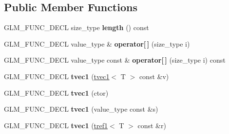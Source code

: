 \subsection*{\-Public \-Member \-Functions}
\begin{DoxyCompactItemize}
\item 
\hypertarget{structglm_1_1detail_1_1tvec1_a92aef643d6d587eb3c0cdc08710d4f74}{\-G\-L\-M\-\_\-\-F\-U\-N\-C\-\_\-\-D\-E\-C\-L size\-\_\-type {\bfseries length} () const }\label{structglm_1_1detail_1_1tvec1_a92aef643d6d587eb3c0cdc08710d4f74}

\item 
\hypertarget{structglm_1_1detail_1_1tvec1_a20e586dbb0fdfd345c66250a776b1246}{\-G\-L\-M\-\_\-\-F\-U\-N\-C\-\_\-\-D\-E\-C\-L value\-\_\-type \& {\bfseries operator\mbox{[}$\,$\mbox{]}} (size\-\_\-type i)}\label{structglm_1_1detail_1_1tvec1_a20e586dbb0fdfd345c66250a776b1246}

\item 
\hypertarget{structglm_1_1detail_1_1tvec1_ad8458f51c2f212caf4f1a66ca507514b}{\-G\-L\-M\-\_\-\-F\-U\-N\-C\-\_\-\-D\-E\-C\-L value\-\_\-type const \& {\bfseries operator\mbox{[}$\,$\mbox{]}} (size\-\_\-type i) const }\label{structglm_1_1detail_1_1tvec1_ad8458f51c2f212caf4f1a66ca507514b}

\item 
\hypertarget{structglm_1_1detail_1_1tvec1_a223f0b0626a866f6d6eff1110623a20d}{\-G\-L\-M\-\_\-\-F\-U\-N\-C\-\_\-\-D\-E\-C\-L {\bfseries tvec1} (\hyperlink{structglm_1_1detail_1_1tvec1}{tvec1}$<$ \-T $>$ const \&v)}\label{structglm_1_1detail_1_1tvec1_a223f0b0626a866f6d6eff1110623a20d}

\item 
\hypertarget{structglm_1_1detail_1_1tvec1_a6a152450aeaad0f0f87e5bc3f8b0bf84}{\-G\-L\-M\-\_\-\-F\-U\-N\-C\-\_\-\-D\-E\-C\-L {\bfseries tvec1} (ctor)}\label{structglm_1_1detail_1_1tvec1_a6a152450aeaad0f0f87e5bc3f8b0bf84}

\item 
\hypertarget{structglm_1_1detail_1_1tvec1_a4ad3cf1387e53c9b86958ffca9010b57}{\-G\-L\-M\-\_\-\-F\-U\-N\-C\-\_\-\-D\-E\-C\-L {\bfseries tvec1} (value\-\_\-type const \&s)}\label{structglm_1_1detail_1_1tvec1_a4ad3cf1387e53c9b86958ffca9010b57}

\item 
\hypertarget{structglm_1_1detail_1_1tvec1_a3520e427bc4946bb1b38b9727dcc5d8f}{\-G\-L\-M\-\_\-\-F\-U\-N\-C\-\_\-\-D\-E\-C\-L {\bfseries tvec1} (\hyperlink{structglm_1_1detail_1_1tref1}{tref1}$<$ \-T $>$ const \&r)}\label{structglm_1_1detail_1_1tvec1_a3520e427bc4946bb1b38b9727dcc5d8f}


\end{DoxyCompactItemize}
